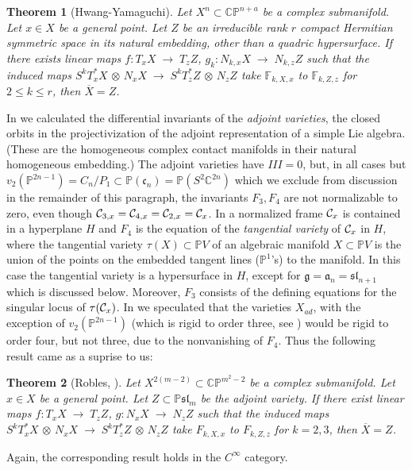 \documentclass[11pt]{amsart}
\newtheorem{theorem}{Theorem}[section]
\theoremstyle{definition}
\theoremstyle{remark}
\numberwithin{equation}{section}
\def\t{\tau}
\def\na{n+\alpha}
\def\BC{\mathbb C}\def\BF{\mathbb F}\def\BO{\mathbb O}\def\BS{\mathbb S}
\def\BP{\mathbb P}
\def\pp#1{\mathbb P^{#1}}
\def\fa{\mathfrak a}\def\fr{\mathfrak r}\def\fz{\mathfrak z}\def\fc{\mathfrak c}
\def\pp#1{{\mathbb P}^{#1}}
\def\na{n+a}
\def\fsl{{\mathfrak {sl}}}
\def\fz{{\mathfrak z}}
\def\fg{{\mathfrak g}}
\def\ot{{\mathord{\,\otimes }\,}}
\def\ra{{\mathord{\;\rightarrow\;}}}
\begin{document}
\begin{theorem} [Hwang-Yamaguchi]\cite{HY}
Let $X^n\subset \BC\pp\na$ be a complex submanifold.  Let $x\in X$ be
a general point. Let  $Z$ be an irreducible
rank $r$  compact
Hermitian symmetric space in its natural embedding, other
than a quadric hypersurface.
 If there exists linear maps $f: T_xX\ra T_zZ$, $g_k: N_{k,x}X\ra
N_{k,z}Z$ such that the induced maps
$S^kT^*_xX\ot N_xX\ra S^kT^*_zZ\ot N_zZ$ take $\BF_{k,X,x}$ to
$\BF_{k,Z,z}$   for $2\leq k\leq r$,
 then $\overline X =Z$.
\end{theorem}


In \cite{LM1} we calculated the differential invariants of the {\it adjoint
varieties}, the closed orbits in the projectivization of the adjoint representation
of a simple Lie algebra. (These are
  the homogeneous complex contact manifolds in their natural homogeneous
embedding.)  The adjoint varieties have $III=0$, but, in all cases but $v_2(\pp{2n-1})=C_n/P_1\subset \BP(\fc_n)=
\BP(S^2\BC^{2n})$ which we exclude from discussion in the remainder of this paragraph,
the invariants $F_3,F_4$ are   not normalizable to zero, even though
${\mathcal C}_{3,x}={\mathcal C}_{4,x}={\mathcal C}_{2,x}={\mathcal C}_x$. In a normalized frame ${\mathcal C}_x$ is contained in a hyperplane $H$
and $F_4$ is the equation of the {\it tangential variety} of ${\mathcal C}_x$ in $H$, where
the tangential variety $\t(X)\subset \BP V$ of an algebraic manifold $X\subset \BP V$ is the union of the points on the embedded tangent
lines ($\pp 1$'s) to the manifold. In this case the tangential variety is a hypersurface
in $H$, except for $\fg=\fa_n=\fsl_{n+1}$ which is discussed below. Moreover,
$F_3$ consists of the defining equations for the singular locus of $\t (\cC_x)$.
In \cite{LM1} we speculated that the varieties $X_{ad}$, with the exception of
$v_2(\pp{2n-1})$ (which is rigid to order three, see \cite{Lrigid}) would be rigid to order four, but not three, due to the nonvanishing
of $F_4$. Thus the following result came as a suprise to us:

\begin{theorem}[Robles, \cite{robles}] Let $X^{2(m-2)}\subset \BC\pp{m^2-2}$ be a complex submanifold.  Let $x\in X$ be
a general point. Let  $Z\subset\BP \fsl_m$ be the  adjoint variety.
 If   there exist  linear maps $f: T_xX\ra T_zZ$, $g: N_{x}X\ra
N_{z}Z$ such that the induced maps
$S^kT^*_xX\ot N_xX\ra S^kT^*_zZ\ot N_zZ$ take $ F_{k,X,x}$ to
$ F_{k,Z,z}$   for $k=2,3$,
 then $\overline X =Z$. 
\end{theorem}

Again, the corresponding result holds in the $C^{\infty}$ category.
\end{document}
